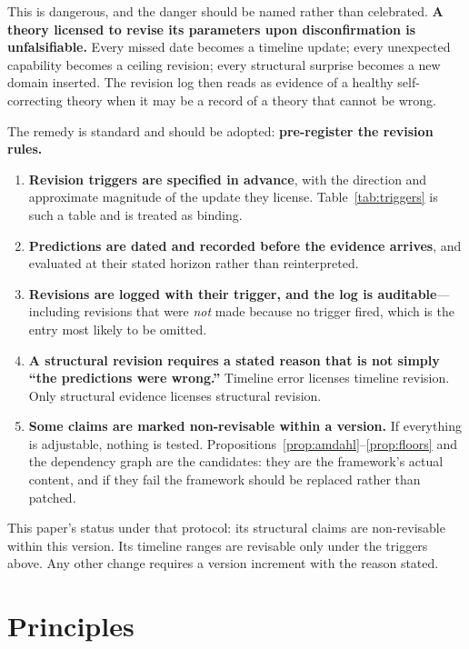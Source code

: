 \documentclass[11pt]{article}
\begin{document}
This is dangerous, and the danger should be named rather than celebrated. \textbf{A theory licensed to revise its parameters upon disconfirmation is unfalsifiable.} Every missed date becomes a timeline update; every unexpected capability becomes a ceiling revision; every structural surprise becomes a new domain inserted. The revision log then reads as evidence of a healthy self-correcting theory when it may be a record of a theory that cannot be wrong.

The remedy is standard and should be adopted: \textbf{pre-register the revision rules.}

\begin{enumerate}
\item \textbf{Revision triggers are specified in advance}, with the direction and approximate magnitude of the update they license. Table~\ref{tab:triggers} is such a table and is treated as binding.
\item \textbf{Predictions are dated and recorded before the evidence arrives}, and evaluated at their stated horizon rather than reinterpreted.
\item \textbf{Revisions are logged with their trigger, and the log is auditable}---including revisions that were \emph{not} made because no trigger fired, which is the entry most likely to be omitted.
\item \textbf{A structural revision requires a stated reason that is not simply ``the predictions were wrong.''} Timeline error licenses timeline revision. Only structural evidence licenses structural revision.
\item \textbf{Some claims are marked non-revisable within a version.} If everything is adjustable, nothing is tested. Propositions~\ref{prop:amdahl}--\ref{prop:floors} and the dependency graph are the candidates: they are the framework's actual content, and if they fail the framework should be replaced rather than patched.
\end{enumerate}

This paper's status under that protocol: its structural claims are non-revisable within this version. Its timeline ranges are revisable only under the triggers above. Any other change requires a version increment with the reason stated.

\section{Principles}
\end{document}
